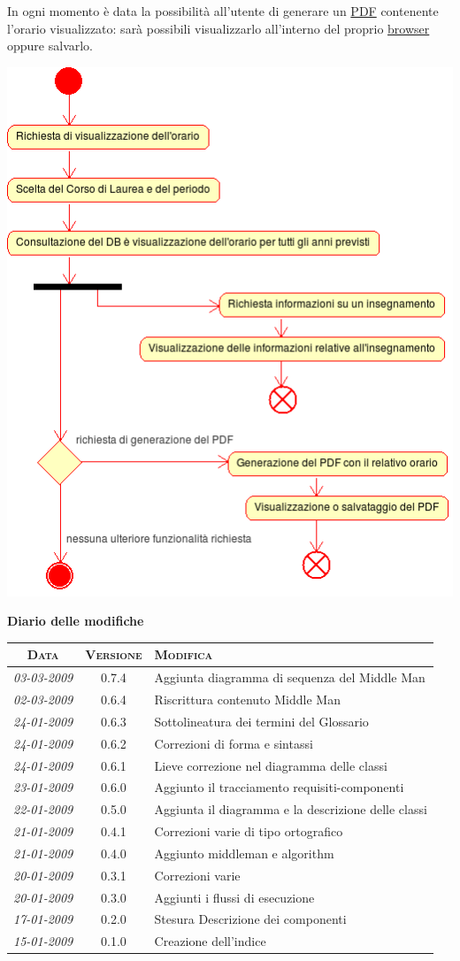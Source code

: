 \documentclass[11pt,a4paper]{article}
\newcommand{\modifiche} 
{
\newpage
\begin{center}
\textbf{Diario delle modifiche} \\
\bigskip
\begin{tabular}{|c|c|p{0.62\textwidth}|}
\hline
\textsc{Data} & \textsc{Versione} & \textsc{Modifica} \\
\hline
\hline
\textit{03-03-2009} & 0.7.4 & Aggiunta diagramma di sequenza del Middle Man \\
\hline
\textit{02-03-2009} & 0.6.4 & Riscrittura contenuto Middle Man \\
\hline
\textit{24-01-2009} & 0.6.3 & Sottolineatura dei termini del Glossario \\
\hline
\textit{24-01-2009} & 0.6.2 & Correzioni di forma e sintassi \\
\hline
\textit{24-01-2009} & 0.6.1 & Lieve correzione nel diagramma delle classi \\
\hline
\textit{23-01-2009} & 0.6.0 & Aggiunto il tracciamento requisiti-componenti \\
\hline
\textit{22-01-2009} & 0.5.0 & Aggiunta il diagramma e la descrizione delle classi \\
\hline
\textit{21-01-2009} & 0.4.1 & Correzioni varie di tipo ortografico\\
\hline
\textit{21-01-2009} & 0.4.0 & Aggiunto middleman e algorithm \\
\hline
\textit{20-01-2009} & 0.3.1 & Correzioni varie \\
\hline
\textit{20-01-2009} & 0.3.0 & Aggiunti i flussi di esecuzione \\
\hline
\textit{17-01-2009} & 0.2.0 & Stesura Descrizione dei componenti \\
\hline
\textit{15-01-2009} & 0.1.0 & Creazione dell'indice \\
\hline
\end{tabular}
\end{center}
}
\begin{document}
In ogni momento è data la possibilità all'utente di generare un \underline{PDF} contenente l'orario visualizzato: sarà possibili visualizzarlo all'interno del proprio \underline{browser} oppure salvarlo.
\begin{center}
 \includegraphics[scale=0.85]{images/consultazione_orario.png}
\end{center}

\modifiche
\end{document}
